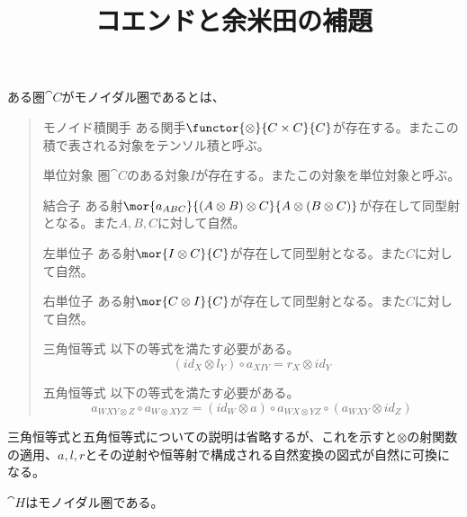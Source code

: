 \documentclass[uplatex,dvipdfmx]{jsarticle}
\begin{document}
\title{コエンドと余米田の補題}
\maketitle
  \begin{define}[モノイダル圏]
    ある圏$\cat{C}$がモノイダル圏であるとは、
    \begin{quote}
      \begin{mydescription}
        \item[モノイド積関手]
        ある関手$\functor{\otimes}{C\times C}{C}$が存在する。またこの積で表される対象をテンソル積と呼ぶ。
        \item[単位対象]圏$\cat{C}$のある対象$I$が存在する。またこの対象を単位対象と呼ぶ。
        \item[結合子]ある射$\mor{a_{ABC}}{(A\otimes B)\otimes C}{A\otimes(B\otimes C)}$が存在して同型射となる。また$A,B,C$に対して自然。
        \item[左単位子]ある射$\mor{I\otimes C}{C}$が存在して同型射となる。また$C$に対して自然。
        \item[右単位子]ある射$\mor{C\otimes I}{C}$が存在して同型射となる。また$C$に対して自然。
        \item[三角恒等式]以下の等式を満たす必要がある。
        \[(id_X\otimes l_Y)\circ a_{XIY}=r_X\otimes id_Y\]
        \item[五角恒等式]以下の等式を満たす必要がある。
        \[a_{WXY\otimes Z}\circ a_{W\otimes XYZ}=(id_W\otimes a)\circ a_{WX\otimes YZ}\circ(a_{WXY}\otimes id_Z) \]
      \end{mydescription}
    \end{quote}
  \end{define}
  三角恒等式と五角恒等式についての説明は省略するが、これを示すと$\otimes$の射関数の適用、$a,l,r$とその逆射や恒等射で構成される自然変換の図式が自然に可換になる。
  \begin{prop}
    $\cat{H}$はモノイダル圏である。
  \end{prop}
\end{document}
